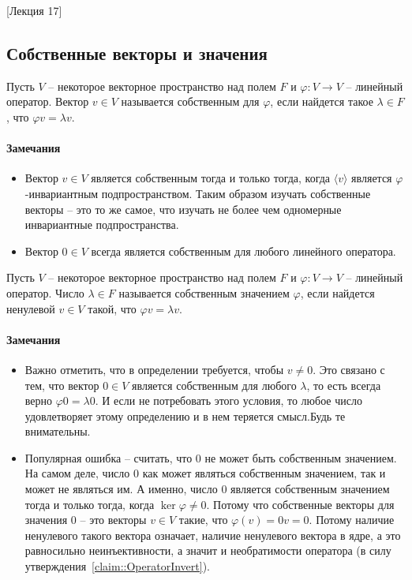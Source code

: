 [Лекция 17]


\subsection{Собственные векторы и значения}

\begin{definition}
Пусть $V$ -- некоторое векторное пространство над полем $F$ и $\varphi \colon V\to V$ -- линейный оператор.
Вектор $v\in V$ называется собственным для $\varphi$, если найдется такое $\lambda \in F$, что $\varphi v = \lambda v$.
\end{definition}

\paragraph{Замечания}

\begin{itemize}
\item Вектор $v\in V$ является собственным тогда и только тогда, когда $\langle v \rangle$ является $\varphi$-инвариантным подпространством.
Таким образом изучать собственные векторы -- это то же самое, что изучать не более чем одномерные инвариантные подпространства.

\item Вектор $0\in V$ всегда является собственным для любого линейного оператора.
\end{itemize}

\begin{definition}
Пусть $V$ -- некоторое векторное пространство над полем $F$ и $\varphi \colon V\to V$ -- линейный оператор.
Число $\lambda \in F$ называется собственным значением $\varphi$, если найдется ненулевой $v\in V$ такой, что $\varphi v = \lambda v$.
\end{definition}

\paragraph{Замечания}

\begin{itemize}
\item Важно отметить, что в определении требуется, чтобы $v\neq 0$.
Это связано с тем, что вектор $0\in V$ является собственным для любого $\lambda$, то есть всегда верно $\varphi 0 = \lambda 0$.
И если не потребовать этого условия, то любое число удовлетворяет этому определению и в нем теряется смысл.Будь те внимательны.

\item Популярная ошибка -- считать, что $0$ не может быть собственным значением.
На самом деле, число $0$ как может являться собственным значением, так и может не являться им.
А именно, число $0$ является собственным значением тогда и только тогда, когда $\ker \varphi \neq 0$.
Потому что собственные векторы для значения $0$ -- это векторы $v\in V$ такие, что $\varphi(v) = 0 v = 0$.
Потому наличие ненулевого такого вектора означает, наличие ненулевого вектора в ядре, а это равносильно неинъективности, а значит и необратимости оператора (в силу утверждения~\ref{claim::OperatorInvert}).
\end{itemize}

